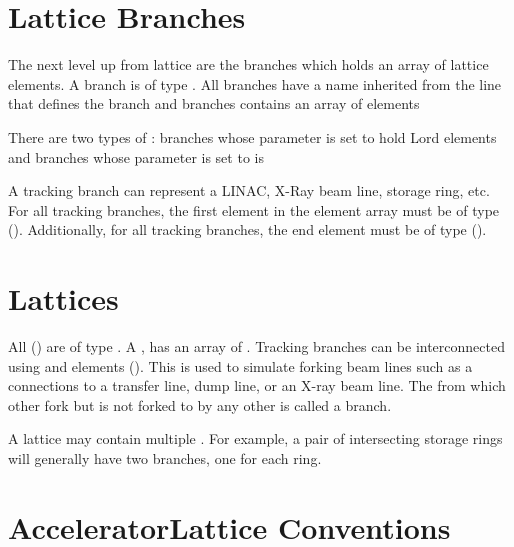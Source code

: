 \section{Lattice Branches}
\label{s:branch.def}

The next level up from lattice  are the branches which
holds an array of lattice elements. A branch is of type . All
branches have a name  inherited from the line that defines
the branch and branches contains an array of elements 

There are two types of : branches whose  parameter is set to
 hold Lord elements and 
branches whose  parameter is set to  is 

A tracking branch can represent a LINAC, X-Ray beam line, storage ring, etc.
For all tracking branches, the first element in the element array
must be of type  ().
Additionally, for all tracking branches, 
the end element must be of type  ().

\section{Lattices}
\label{s:lattice.def}

All  () are of type .
A , has an array of  . 
Tracking branches can be interconnected using  and  elements (). 
This is used to simulate forking beam lines such as a connections to a transfer line, dump line, or an
X-ray beam line. The  from which other  fork but is not forked to by any
other  is called a  branch.

A lattice may contain multiple  . For example, a pair of intersecting storage
rings will generally have two  branches, one for each ring.

\section{AcceleratorLattice Conventions}
\label{s:conventions}

